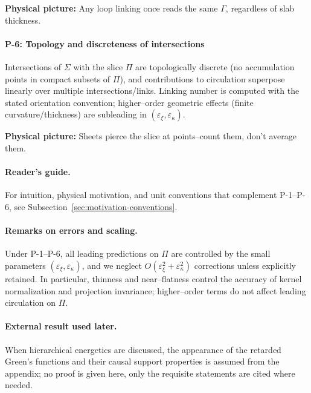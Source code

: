 \begin{physbox}\textbf{Physical picture:} Any loop linking once reads the same $\Gamma$, regardless of slab thickness.\end{physbox}

\paragraph{P-6: Topology and discreteness of intersections}
\label{post:P6}
Intersections of $\Sigma$ with the slice $\Pi$ are topologically discrete (no accumulation points in compact subsets of $\Pi$), and contributions to circulation superpose linearly over multiple intersections/links. Linking number is computed with the stated orientation convention; higher–order geometric effects (finite curvature/thickness) are subleading in $(\varepsilon_\xi,\varepsilon_\kappa)$.

\begin{physbox}\textbf{Physical picture:} Sheets pierce the slice at points--count them, don't average them.\end{physbox}

\paragraph{Reader's guide.}
For intuition, physical motivation, and unit conventions that complement P-1–P-6, see Subsection~\ref{sec:motivation-conventions}.

\paragraph{Remarks on errors and scaling.}
Under P-1–P-6, all leading predictions on $\Pi$ are controlled by the small parameters $(\varepsilon_\xi,\varepsilon_\kappa)$, and we neglect $O(\varepsilon_\xi^2+\varepsilon_\kappa^2)$ corrections unless explicitly retained. In particular, thinness and near–flatness control the accuracy of kernel normalization and projection invariance; higher–order terms do not affect leading circulation on $\Pi$.

\paragraph{External result used later.}
When hierarchical energetics are discussed, the appearance of the retarded Green's functions and their causal support properties is assumed from the appendix; no proof is given here, only the requisite statements are cited where needed.

